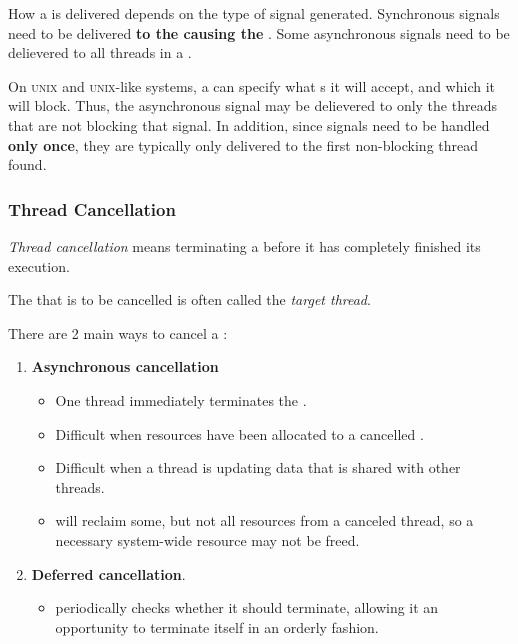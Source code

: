 How a  is delivered depends on the type of signal generated.
Synchronous signals need to be delivered \textbf{to the  causing the }.
Some asynchronous signals need to be delievered to all threads in a .

On \textsc{unix} and \textsc{unix}-like systems, a  can specify what s it will accept, and which it will block.
Thus, the asynchronous signal may be delievered to only the threads that are not blocking that signal.
In addition, since signals need to be handled \textbf{only once}, they are typically only delivered to the first non-blocking thread found.

\subsubsection{Thread Cancellation}\label{subsubsec:Thread_Cancellation}
\begin{definition}\label{def:Thread_Cancellation}
  \emph{Thread cancellation} means terminating a  before it has completely finished its execution.

  \begin{remark}\label{rmk:Target_Thread}
    The  that is to be cancelled is often called the \emph{target thread}.
  \end{remark}
\end{definition}

There are 2 main ways to cancel a :
\begin{enumerate}[noitemsep]
\item \textbf{Asynchronous cancellation}
  \begin{itemize}[noitemsep]
  \item One thread immediately terminates the .
  \item Difficult when resources have been allocated to a cancelled .
  \item Difficult when a thread is updating data that is shared with other threads.
  \item {} will reclaim some, but not all resources from a canceled thread, so a necessary system-wide resource may not be freed.
  \end{itemize}

\item \textbf{Deferred cancellation}.
  \begin{itemize}[noitemsep]
  \item {} periodically checks whether it should terminate, allowing it an opportunity to terminate itself in an orderly fashion.
  \end{itemize}
\end{enumerate}

